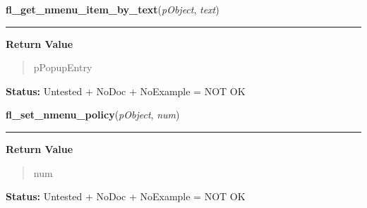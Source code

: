     \label{xformslib:library:fl_get_nmenu_item_by_text}

    \vspace{0.5ex}

\hspace{.8\funcindent}\begin{boxedminipage}{\funcwidth}

    \raggedright \textbf{fl\_get\_nmenu\_item\_by\_text}(\textit{pObject}, \textit{text})

    \vspace{-1.5ex}

    \rule{\textwidth}{0.5\fboxrule}
\setlength{\parskip}{2ex}
\setlength{\parskip}{1ex}
      \textbf{Return Value}
    \vspace{-1ex}

      \begin{quote}
      pPopupEntry

      \end{quote}

\textbf{Status:} Untested + NoDoc + NoExample = NOT OK



    \end{boxedminipage}

    \label{xformslib:library:fl_set_nmenu_policy}

    \vspace{0.5ex}

\hspace{.8\funcindent}\begin{boxedminipage}{\funcwidth}

    \raggedright \textbf{fl\_set\_nmenu\_policy}(\textit{pObject}, \textit{num})

    \vspace{-1.5ex}

    \rule{\textwidth}{0.5\fboxrule}
\setlength{\parskip}{2ex}
\setlength{\parskip}{1ex}
      \textbf{Return Value}
    \vspace{-1ex}

      \begin{quote}
      num

      \end{quote}

\textbf{Status:} Untested + NoDoc + NoExample = NOT OK



    \end{boxedminipage}

